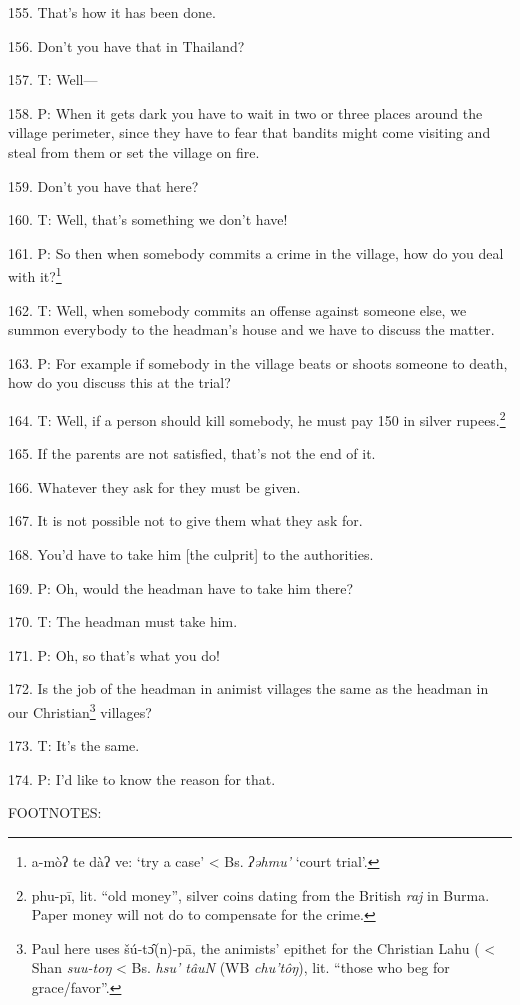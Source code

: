 155. That's how it has been done.

156. Don't you have that in Thailand?

157. T: Well---

158. P: When it gets dark you have to wait in two or three places around the village
perimeter, since they have to fear that bandits might come visiting and steal from
them or set the village on fire.

159. Don't you have that here?

160. T: Well, that's something we don't have!

161. P: So then when somebody commits a crime in the village, how do you deal with
it?\footnote{a-mòʔ te dàʔ ve: `try a case' < Bs. \textit{ʔəhmu' }`court trial'.}

162. T: Well, when somebody commits an offense against someone else, we summon
everybody to the headman's house and we have to discuss the matter.

163. P: For example if somebody in the village beats or shoots someone to death,
how do you discuss this at the trial?

164. T: Well, if a person should kill somebody, he must pay 150 in silver rupees.\footnote{phu-pī, lit. ``old money'', silver coins dating from the British \textit{raj} in Burma. Paper money will not do to compensate for the crime.}

165. If the parents are not satisfied, that's not the end of it.

166. Whatever they ask for they must be given.

167. It is not possible not to give them what they ask for.

168. You'd have to take him [the culprit] to the authorities.

169. P: Oh, would the headman have to take him there?

170. T: The headman must take him.

171. P: Oh, so that's what you do!

172. Is the job of the headman in animist villages the same as the headman in our
Christian\footnote{Paul here uses šú-tɔ̂(n)-pā, the animists' epithet for the Christian Lahu ( < Shan \textit{suu-toŋ} < Bs. \textit{hsu' tâuN} (WB \textit{chu'tôŋ}), lit. ``those who beg for grace/favor''.} villages?

173. T: It's the same.

174. P: I'd like to know the reason for that.

FOOTNOTES:

